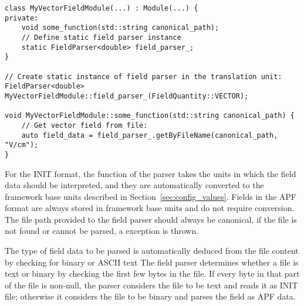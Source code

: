 \begin{verbatim}
class MyVectorFieldModule(...) : Module(...) {
private:
    void some_function(std::string canonical_path);
    // Define static field parser instance
    static FieldParser<double> field_parser_;
}

// Create static instance of field parser in the translation unit:
FieldParser<double> MyVectorFieldModule::field_parser_(FieldQuantity::VECTOR);

void MyVectorFieldModule::some_function(std::string canonical_path) {
    // Get vector field from file:
    auto field_data = field_parser_.getByFileName(canonical_path, "V/cm");
}
\end{verbatim}

For the INIT format, the  function of the parser takes the units in which the field data should be interpreted, and they are automatically converted to the framework base units described in Section~\ref{sec:config_values}. Fields in the APF format are always stored in framework base units and do not require conversion.
The file path provided to the field parser should always be canonical, if the file is not found or cannot be parsed, a  exception is thrown.

The type of field data to be parsed is automatically deduced from the file content by checking for binary or ASCII text
The field parser determines whether a file is text or binary by checking the first few bytes in the file.
If every byte in that part of the file is non-null, the parser considers the file to be text and reads it as INIT file; otherwise it considers the file to be binary and parses the field as APF data.

\label{sec:tcad_electric_field_converter}

\label{sec:root_analysis_macros}
